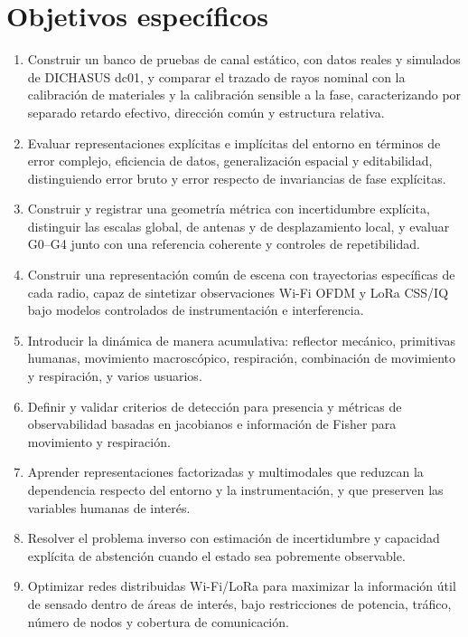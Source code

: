 \section{Objetivos específicos}

\begin{enumerate}[label=\textbf{O\arabic*:},leftmargin=3em]
\item Construir un banco de pruebas de canal estático, con datos reales y simulados de DICHASUS dc01, y comparar el trazado de rayos nominal con la calibración de materiales y la calibración sensible a la fase, caracterizando por separado retardo efectivo, dirección común y estructura relativa.
\item Evaluar representaciones explícitas e implícitas del entorno en términos de error complejo, eficiencia de datos, generalización espacial y editabilidad, distinguiendo error bruto y error respecto de invariancias de fase explícitas.
\item Construir y registrar una geometría métrica con incertidumbre explícita, distinguir las escalas global, de antenas y de desplazamiento local, y evaluar G0--G4 junto con una referencia coherente y controles de repetibilidad.
\item Construir una representación común de escena con trayectorias específicas de cada radio, capaz de sintetizar observaciones Wi-Fi OFDM y LoRa CSS/IQ bajo modelos controlados de instrumentación e interferencia.
\item Introducir la dinámica de manera acumulativa: reflector mecánico, primitivas humanas, movimiento macroscópico, respiración, combinación de movimiento y respiración, y varios usuarios.
\item Definir y validar criterios de detección para presencia y métricas de observabilidad basadas en jacobianos e información de Fisher para movimiento y respiración.
\item Aprender representaciones factorizadas y multimodales que reduzcan la dependencia respecto del entorno y la instrumentación, y que preserven las variables humanas de interés.
\item Resolver el problema inverso con estimación de incertidumbre y capacidad explícita de abstención cuando el estado sea pobremente observable.
\item Optimizar redes distribuidas Wi-Fi/LoRa para maximizar la información útil de sensado dentro de áreas de interés, bajo restricciones de potencia, tráfico, número de nodos y cobertura de comunicación.
\end{enumerate}


